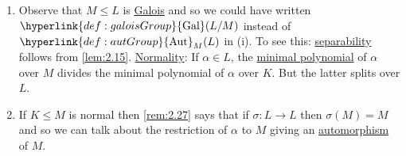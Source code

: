 \documentclass{article}
\DeclareMathOperator{\Aut}{Aut}
\DeclareMathOperator{\Gal}{Gal}
\begin{document}
\begin{remark}\leavevmode
    \begin{enumerate}[label=(\roman*)]
        \item Observe that $M \leq L$ is \hyperlink{def:galoisExt}{Galois} and so we could have written $\hyperlink{def:galoisGroup}{\Gal}(L/M)$ instead of $\hyperlink{def:autGroup}{\Aut}_M(L)$ in (i).
            To see this: \hyperlink{def:separableExt}{separability} follows from \cref{lem:2.15}.
            \hyperlink{def:normal}{Normality}: If $\alpha \in L$, the \hyperlink{def:minimalPoly}{minimal polynomial} of $\alpha$ over $M$ divides the minimal polynomial of $\alpha$ over $K$.
            But the latter splits over $L$.
        \item If $K \leq M$ is normal then \cref{rem:2.27} says that if $\sigma: L \to L$ then $\sigma(M) = M$ and so we can talk about the restriction of $\alpha$ to $M$ giving an \hyperlink{def:homo}{automorphism} of $M$.
    \end{enumerate}
\end{remark}
\end{document}
